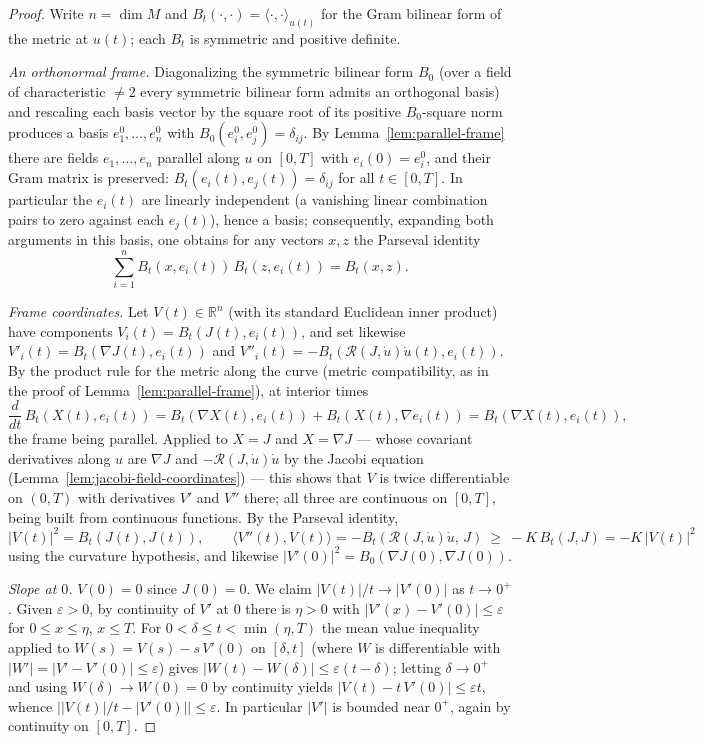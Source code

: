 \begin{proof}
\leanok
Write $n=\dim M$ and $B_t(\cdot,\cdot)=\langle\cdot,\cdot\rangle_{u(t)}$
for the Gram bilinear form of the metric at $u(t)$; each $B_t$ is
symmetric and positive definite.

{\em An orthonormal frame.} Diagonalizing the symmetric bilinear form
$B_0$ (over a field of characteristic $\not=2$ every symmetric bilinear
form admits an orthogonal basis) and rescaling each basis vector by the
square root of its positive $B_0$-square norm produces a basis
$e_1^0,\ldots,e_n^0$ with $B_0(e_i^0,e_j^0)=\delta_{ij}$. By
Lemma~\ref{lem:parallel-frame} there are fields $e_1,\ldots,e_n$ parallel
along $u$ on $[0,T]$ with $e_i(0)=e_i^0$, and their Gram matrix is
preserved: $B_t(e_i(t),e_j(t))=\delta_{ij}$ for all $t\in[0,T]$. In
particular the $e_i(t)$ are linearly independent (a vanishing linear
combination pairs to zero against each $e_j(t)$), hence a basis;
consequently, expanding both arguments in this basis, one obtains for any
vectors $x,z$ the Parseval identity
$$\sum_{i=1}^n B_t(x,e_i(t))\,B_t(z,e_i(t))=B_t(x,z).$$

{\em Frame coordinates.} Let $V(t)\in\mathbb{R}^n$ (with its standard
Euclidean inner product) have components $V_i(t)=B_t(J(t),e_i(t))$, and
set likewise $V'_i(t)=B_t(\nabla J(t),e_i(t))$ and
$V''_i(t)=-B_t({\mathcal R}(J,\dot u)\dot u(t),e_i(t))$. By the product
rule for the metric along the curve (metric compatibility, as in the
proof of Lemma~\ref{lem:parallel-frame}), at interior times
$$\frac{d}{dt}\,B_t(X(t),e_i(t))
=B_t(\nabla X(t),e_i(t))+B_t(X(t),\nabla e_i(t))
=B_t(\nabla X(t),e_i(t)),$$
the frame being parallel. Applied to $X=J$ and $X=\nabla J$ — whose
covariant derivatives along $u$ are $\nabla J$ and
$-{\mathcal R}(J,\dot u)\dot u$ by the Jacobi equation
(Lemma~\ref{lem:jacobi-field-coordinates}) — this shows that $V$ is twice
differentiable on $(0,T)$ with derivatives $V'$ and $V''$ there; all
three are continuous on $[0,T]$, being built from continuous functions.
By the Parseval identity,
$$|V(t)|^2=B_t(J(t),J(t)),\qquad
\langle V''(t),V(t)\rangle=-B_t({\mathcal R}(J,\dot u)\dot u,\,J)
\ \ge\ -K\,B_t(J,J)=-K\,|V(t)|^2$$
using the curvature hypothesis, and likewise
$|V'(0)|^2=B_0(\nabla J(0),\nabla J(0))$.

{\em Slope at $0$.} $V(0)=0$ since $J(0)=0$. We claim
$|V(t)|/t\to|V'(0)|$ as $t\to0^+$. Given $\varepsilon>0$, by continuity
of $V'$ at $0$ there is $\eta>0$ with $|V'(x)-V'(0)|\le\varepsilon$ for
$0\le x\le\eta$, $x\le T$. For $0<\delta\le t<\min(\eta,T)$ the mean
value inequality applied to $W(s)=V(s)-s\,V'(0)$ on $[\delta,t]$ (where
$W$ is differentiable with $|W'|=|V'-V'(0)|\le\varepsilon$) gives
$|W(t)-W(\delta)|\le\varepsilon(t-\delta)$; letting $\delta\to0^+$ and
using $W(\delta)\to W(0)=0$ by continuity yields
$|V(t)-t\,V'(0)|\le\varepsilon t$, whence
$\bigl||V(t)|/t-|V'(0)|\bigr|\le\varepsilon$. In particular $|V'|$ is
bounded near $0^+$, again by continuity on $[0,T]$.


\end{proof}
